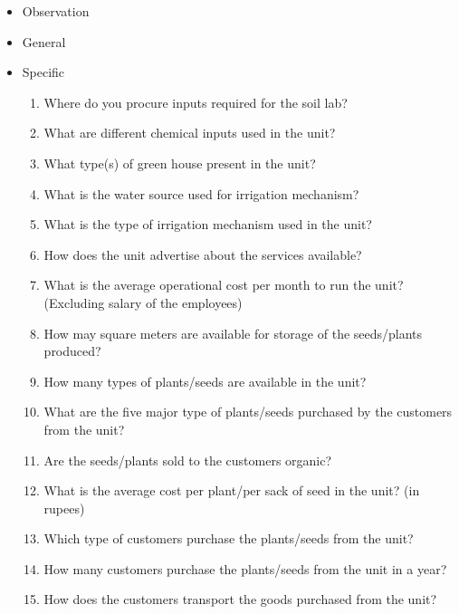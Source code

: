 \documentclass[oneside,twocolumn]{article}
\begin{document}
               \begin{itemize}
               \item Observation
               \item General
               \item Specific
                 \begin{enumerate}
                 \item Where do you procure inputs required for the soil lab?
                 \item What are different chemical inputs used in the unit?
                 \item What type(s) of green house present in the unit?
                 \item What is the water source used for irrigation mechanism?
                 \item What is the type of irrigation mechanism used in the unit?
                 \item How does the unit advertise about the services
                   available?
                 \item What is the average operational cost per month to run
                   the unit? (Excluding salary of the employees)
                 \item How may square meters are available for storage of the
                   seeds/plants produced?
                 \item How many types of plants/seeds are available in the
                   unit?
                 \item What are the five major type of plants/seeds purchased
                   by the customers from the unit?
                 \item Are the seeds/plants sold to the customers organic?
                 \item What is the average cost per plant/per sack of seed in
                   the unit? (in rupees)
                 \item Which type of customers purchase the plants/seeds from
                   the unit?
                 \item How many customers purchase the plants/seeds from the
                   unit in a year?
                 \item How does the customers transport the goods purchased
                   from the unit?
                 \end{enumerate}
               \end{itemize}
\end{document}
